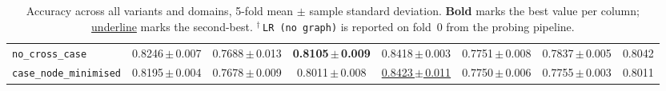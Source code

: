 \begin{table}[H]
\begin{adjustbox}{max width=\textwidth}
\begin{tabular}{lccccccc}
    \texttt{no\_cross\_case} & 0.8246\,$\pm$\,0.007 & 0.7688\,$\pm$\,0.013 & \textbf{0.8105\,$\pm$\,0.009} & 0.8418\,$\pm$\,0.003 & 0.7751\,$\pm$\,0.008 & 0.7837\,$\pm$\,0.005 & 0.8042 \\
    \texttt{case\_node\_minimised} & 0.8195\,$\pm$\,0.004 & 0.7678\,$\pm$\,0.009 & 0.8011\,$\pm$\,0.008 & \underline{0.8423\,$\pm$\,0.011} & 0.7750\,$\pm$\,0.006 & 0.7755\,$\pm$\,0.003 & 0.8011 \\
    \bottomrule
  \end{tabular}
  \end{adjustbox}
  \caption{Accuracy across all variants and domains, 5-fold mean
  $\pm$ sample standard deviation. \textbf{Bold} marks the best
  value per column; \underline{underline} marks the second-best.
  $^{\dagger}$\,\texttt{LR (no graph)} is reported on fold~0 from
  the probing pipeline.}
  \label{tab:cross_bucket_accuracy}
\end{table}

